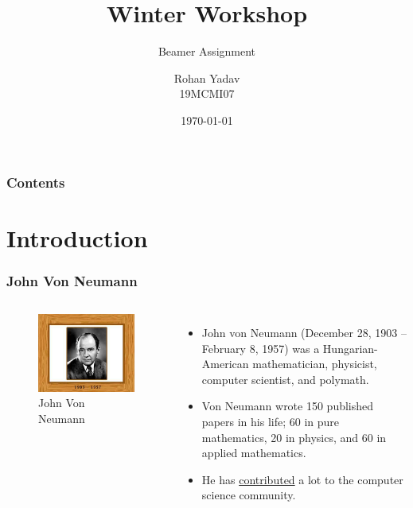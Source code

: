 \documentclass{beamer}
\title{Winter Workshop}
\subtitle{Beamer Assignment}
\author{
    Rohan Yadav\\19MCMI07
}
\institute{SCIS, UOH}
\date{\today}
\begin{document}
    \begin{frame}
        \titlepage
    \end{frame}
    
    \begin{frame}
        \frametitle{Contents}
        \tableofcontents
    \end{frame}
    
    \section{Introduction}
    
    \begin{frame}
        \frametitle{John Von Neumann}
        \begin{columns}
                \begin{figure}
                    \centering
                    \includegraphics[scale=0.39]{res/images/john-von-neumann.jpg}
                    \caption{John Von Neumann}
                    \label{fig:neumann}
                \end{figure}
                \begin{itemize}
                    \item John von Neumann (December 28, 1903 – February 8, 1957) was a Hungarian-American mathematician, physicist, computer scientist, and polymath.
                    \item Von Neumann wrote 150 published papers in his life; 60 in pure mathematics, 20 in physics, and 60 in applied mathematics.
                    \item He has \hyperlink{contributed}{contributed} a lot to the computer science community.
                \end{itemize}
        \end{columns}
    \end{frame}
\end{document}
